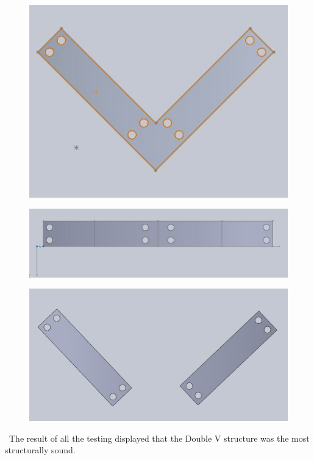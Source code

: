 \documentclass[titlepage, letterpaper,12pt]{article}
\begin{document}
\begin{figure}[!htbp]\centering
\begin{minipage}{.5\textwidth}\centering
\includegraphics[width=.8\textwidth]{single-v.JPG}
\label{singlev}
\end{minipage}
\end{figure}

\begin{figure}[!htbp]\centering
\begin{minipage}{.5\textwidth}\centering
\includegraphics[width=.8\textwidth]{single-bar.JPG}
\label{singlebar}
\end{minipage}
\end{figure}

\begin{figure}[!htbp]\centering
\begin{minipage}{.5\textwidth}\centering
\includegraphics[width=.8\textwidth]{single-accent.JPG}
\label{single-accent}
\end{minipage}
\end{figure}
\
The result of all the testing displayed that the Double V structure was the most structurally sound.
\end{document}
